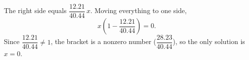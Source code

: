 The right side equals $\dfrac{12.21}{40.44}\,x$. Moving everything to one side,
\[
x\left(1-\dfrac{12.21}{40.44}\right)=0.
\]
Since $\dfrac{12.21}{40.44}\ne1$, the bracket is a nonzero number ($\dfrac{28.23}{40.44}$), so the only solution is $\boxed{x=0}$.

